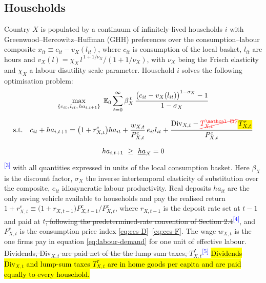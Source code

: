 \documentclass[11pt]{article}
\newcommand{\E}{\mathbb{E}}
\newcommand{\A}[1]{\hl{#1}}
\newcommand{\D}[1]{{\color{red}\st{#1}}}
\newcommand{\Am}[1]{\mathchoice
  {{\setlength{\fboxsep}{1pt}\colorbox{yellow}{$\displaystyle #1$}}}
  {{\setlength{\fboxsep}{1pt}\colorbox{yellow}{$\textstyle #1$}}}
  {{\setlength{\fboxsep}{1pt}\colorbox{yellow}{$\scriptstyle #1$}}}
  {{\setlength{\fboxsep}{1pt}\colorbox{yellow}{$\scriptscriptstyle #1$}}}}
\newcommand{\Dm}[1]{{\color{red}\cancel{#1}}}
\newcommand{\chg}[1]{\textsuperscript{\textcolor{blue}{\scriptsize[#1]}}}
\begin{document}
\subsection{Households}
\label{sec:Households}
Country $X$ is populated by a continuum of infinitely-lived households $i$ with Greenwood--Hercowitz--Huffman (GHH) preferences over the consumption--labour composite $x_{it}\equiv c_{it}-v_X(l_{it})$, where $c_{it}$ is consumption of the local basket, $l_{it}$ are hours and $v_X(l)=\chi_X\,l^{\,1+1/\nu_X}/(1+1/\nu_X)$, with $\nu_X$ being the Frisch  elasticity and $\chi_X$ a labour disutility scale  parameter. Household $i$ solves the following optimisation problem:
\begin{gather}
  \max_{\{c_{it},\,l_{it},\,ha_{i,t+1}\}}\;
    \E_0\sum_{t=0}^{\infty}\beta_X^{\,t}\,
    \frac{\bigl(c_{it}-v_X(l_{it})\bigr)^{1-\sigma_X}-1}{1-\sigma_X}
    \label{eq:hh-objective}\\[6pt]
  \text{s.t.}\quad
    c_{it}+ha_{i,t+1}
    =\bigl(1+r^{c}_{X,t}\bigr)ha_{it}
    +\frac{w_{X,t}}{P^{c}_{X,t}}\,e_{it}l_{it}
    +\frac{\mathrm{Div}_{X,t} - \Dm{T_{X,t}^{\mathcal{l}}}\Am{T^{\tau}_{X,t}}}{P^{c}_{X,t}}
    \label{eq:hh-budget}\\[6pt]
  ha_{i,t+1}\ \ge\ \underline{ha}_X=0
    \label{eq:hh-borrowing}
\end{gather}
\chg{3} with all quantities expressed in units of the local consumption basket. Here $\beta_X$ is the discount factor, $\sigma_X$ the inverse intertemporal elasticity of substitution over the composite, $e_{it}$ idiosyncratic labour productivity. Real deposits $ha_{it}$ are the only saving vehicle available to households and pay the realised return $1+r^{c}_{X,t}\equiv\bigl(1+r_{X,t-1}\bigr)P^{c}_{X,t-1}/P^{c}_{X,t}$, where $r_{X,t-1}$ is the deposit rate set at $t-1$ and paid at $t$\D{, following the predetermined-rate convention of Section 2.4}\chg{4}, and $P^{c}_{X,t}$ is the consumption price index \eqref{eq:ces-D}--\eqref{eq:ces-F}. The wage $w_{X,t}$ is the one firms pay in equation \eqref{eq:labour-demand} for one unit of effective labour. \D{Dividends, Div$_{X,t}$ are paid net of the the lump sum taxes, $T^{\mathcal{l}}_{X,t}$}\chg{5} \A{Dividends $\mathrm{Div}_{X,t}$ and lump-sum taxes $T^{\tau}_{X,t}$ are in home goods per capita and are paid equally to every household.}
\end{document}
